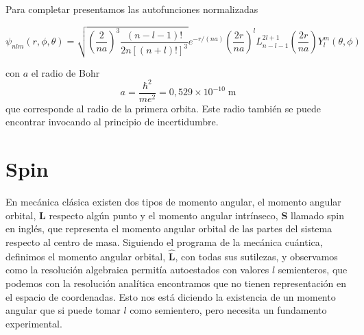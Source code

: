 Para completar presentamos las autofunciones normalizadas

\begin{equation}
    \psi_{nlm}(r,\phi,\theta) = \sqrt{\left(\frac{2}{n a}\right)^3 \frac{(n - l - 1)!}{2n[(n + l)!]^3}} e^{-r/(na)} \left(\frac{2r}{na}\right)^l L^{2l + 1}_{n - l - 1}\left(\frac{2r}{na}\right) Y^{m}_{l}(\theta, \phi)
\end{equation}

con $a$ el radio de Bohr
\begin{equation}
    a = \frac{\hbar^2}{m e^2} = 0,529 \times 10^{-10}\;\text{m}
\end{equation}
que corresponde al radio de la primera orbita.
Este radio también se puede encontrar invocando al principio de incertidumbre.




\section{Spin}

En mecánica clásica existen dos tipos de momento angular, el momento angular orbital, $\boldsymbol{L}$ respecto algún punto y el momento angular intrínseco, $\boldsymbol{S}$ llamado spin en inglés, que representa el momento angular orbital de las partes del sistema respecto al centro de masa.
Siguiendo el programa de la mecánica cuántica, definimos el momento angular orbital, $\hat{\boldsymbol{L}}$, con todas sus sutilezas, y observamos como la resolución algebraica permitía autoestados con valores $l$ semienteros, que podemos con la resolución analítica encontramos que no tienen representación en el espacio de coordenadas.
Esto nos está diciendo la existencia de un momento angular que si puede tomar $l$ como semientero, pero necesita un fundamento experimental.

